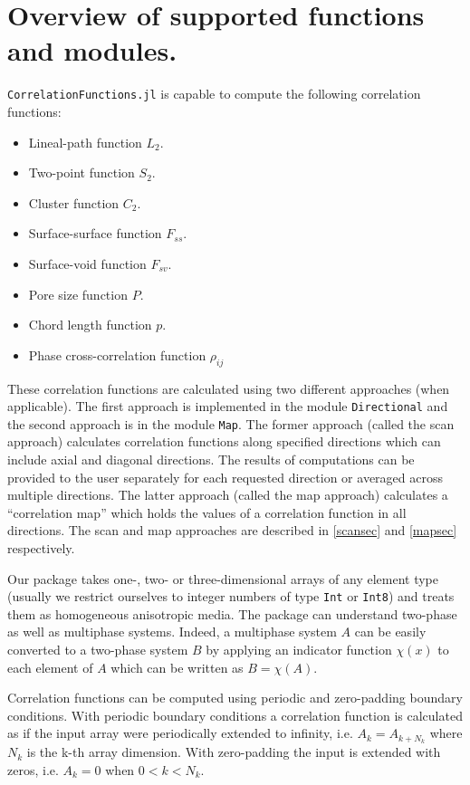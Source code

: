 \documentclass[reprint,amsmath,amssymb,aps,pre,showkeys,showpacs,nofootinbib]{revtex4-1}
\newcommand{\code}[1]{\colorbox{light-gray}{\texttt{#1}}}
\begin{document}
\section{Overview of supported functions and modules.}
\label{oversec}
\verb+CorrelationFunctions.jl+ is capable to compute the following correlation
functions:
\begin{itemize}
\item Lineal-path function $L_2$.
\item Two-point function $S_2$.
\item Cluster function $C_2$.
\item Surface-surface function $F_{ss}$.
\item Surface-void function $F_{sv}$.
\item Pore size function $P$.
\item Chord length function $p$.
\item Phase cross-correlation function $\rho_{ij}$
\end{itemize}

These correlation functions are calculated using two different approaches (when
applicable). The first approach is implemented in the module \code{Directional}
and the second approach is in the module \code{Map}. The former approach (called
the scan approach) calculates correlation functions along specified directions
which can include axial and diagonal directions. The results of computations can
be provided to the user separately for each requested direction or averaged
across multiple directions. The latter approach (called the map approach)
calculates a ``correlation map'' which holds the values of a correlation
function in all directions. The scan and map approaches are described in
\cref{scansec} and \cref{mapsec} respectively.

Our package takes one-, two- or three-dimensional arrays of any element type
(usually we restrict ourselves to integer numbers of type \code{Int} or
\code{Int8}) and treats them as homogeneous anisotropic media. The package can
understand two-phase as well as multiphase systems. Indeed, a multiphase system
$A$ can be easily converted to a two-phase system $B$ by applying an indicator
function $\chi(x)$ to each element of $A$ which can be written as $B = \chi(A)$.

Correlation functions can be computed using periodic and zero-padding boundary
conditions. With periodic boundary conditions a correlation function is
calculated as if the input array were periodically extended to infinity,
i.e. $A_k = A_{k+N_k}$ where $N_k$ is the k-th array dimension. With
zero-padding the input is extended with zeros, i.e. $A_k = 0$ when
$0 < k < N_k$.
\end{document}
